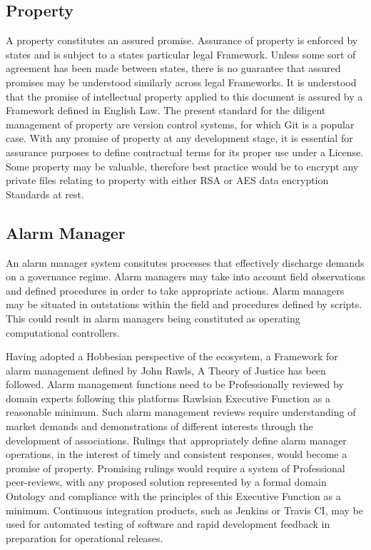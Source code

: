 \documentclass[11pt, oneside]{article}   	%
\begin{document}
\subsection{Property}
A property constitutes an assured promise.
Assurance of property is enforced by states and is subject to a states particular legal Framework.
Unless some sort of agreement has been made between states, there is no guarantee that assured promises may be understood similarly across legal Frameworks.
It is understood that the promise of intellectual property applied to this document is assured by a Framework defined in English Law.
The present standard for the diligent management of property are version control systems, for which Git is a popular case.
With any promise of property at any development stage, it is essential for assurance purposes to define contractual terms for its proper use under a License.
Some property may be valuable, therefore best practice would be to encrypt any private files relating to property with either RSA or AES data encryption Standards at rest.

\subsection{Alarm Manager}
An alarm manager system consitutes processes that effectively discharge demands on a governance regime.
Alarm managers may take into account field observations and defined procedures in order to take appropriate actions.
Alarm managers may be situated in outstations within the field and procedures defined by scripts.
This could result in alarm managers being constituted as operating computational controllers.\

Having adopted a Hobbesian perspective of the ecosystem, a Framework for alarm management defined by John Rawls, A Theory of Justice has been followed.
Alarm management functions need to be Professionally reviewed by domain experts following this platforms Rawlsian Executive Function as a reasonable minimum.
Such alarm management reviews require understanding of market demands and demonstrations of different interests through the development of associations.
Rulings that appropriately define alarm manager operations, in the interest of timely and consistent responses, would become a promise of property.
Promising rulings would require a system of Professional peer-reviews, with any proposed solution represented by a formal domain Ontology and compliance with the principles of this Executive Function as a minimum.
Continuous integration products, such as Jenkins or Travis CI, may be used for automated testing of software and rapid development feedback in preparation for operational releases.\
\end{document}
